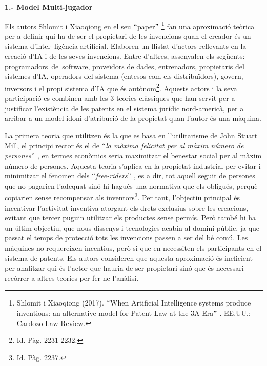 \documentclass[12pt]{article}
\begin{document}
\vspace{\baselineskip}
\begin{justify}
\textbf{1.- Model Multi-jugador }
\end{justify}\par


\vspace{\baselineskip}
\begin{justify}
Els autors Shlomit i Xiaoqiong en el seu $``$paper$"$ \footnote{ Shlomit i Xiaoqiong (2017). $``$When Artificial Intelligence systems produce inventions: an alternative model for Patent Law at the 3A Era$"$ . EE.UU.: Cardozo Law Review.  } fan una aproximació teòrica per a definir qui ha de ser el propietari de les invencions quan el creador és un sistema d’intel$ \cdot $ ligència artificial. Elaboren un llistat d’actors rellevants en la creació d’IA i de les seves invencions. Entre d’altres, assenyalen els següents: programadors\ de\ software, proveïdors de dades, entrenadors, propietaris del sistemes d’IA,  operadors del sistema (entesos com els distribuïdors), govern,  inversors i el propi sistema d’IA que és autònom\footnote{ Id. Pàg. 2231-2232. }. Aquests actors i la seva participació es combinen amb les 3 teories clàssiques que han servit per a justificar l’existència de les patents en el sistema jurídic nord-americà, per a arribar a un model idoni d’atribució de la propietat quan l’autor és una màquina. 
\end{justify}\par


\vspace{\baselineskip}
\begin{justify}
La primera teoria que utilitzen és la que es basa en l’utilitarisme de John Stuart Mill, el principi rector és el de $``$\textit{la màxima felicitat per al màxim número de persones}$"$ , en termes econòmics seria maximitzar el benestar social per al màxim número de persones. Aquesta teoria s’aplica en la propietat industrial  per evitar i minimitzar el fenomen dels $``$\textit{free-riders$"$ }, es a dir, tot aquell seguit de persones que no pagarien l’adequat sinó hi hagués una normativa que els obligués, perquè copiarien sense recompensar als inventors\footnote{ Id. Pàg. 2237. }. Per tant, l’objectiu principal és incentivar l’activitat inventiva atorgant els drets exclusius sobre les creacions, evitant que tercer puguin utilitzar els productes sense permís. Però també hi ha un últim objectiu, que nous dissenys i tecnologies acabin al domini públic, ja que passat el temps de protecció tots les invencions passen a ser del bé comú. Les màquines no requereixen incentius, però si que en necessiten els participants en el sistema de patents. Els autors consideren que aquesta aproximació és ineficient per analitzar qui és l’actor que hauria de ser propietari sinó que és necessari recórrer a altres teories per fer-ne l’anàlisi.
\end{justify}\par
\end{document}
